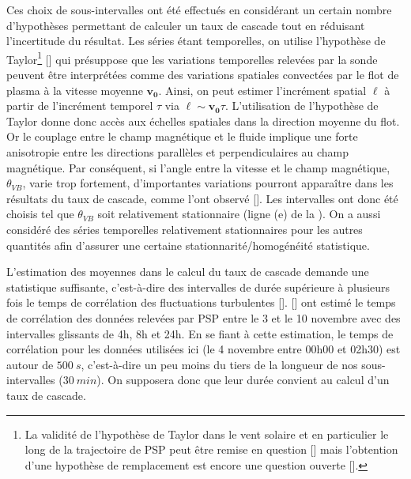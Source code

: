 Ces choix de sous-intervalles ont été effectués en considérant un certain nombre d'hypothèses permettant de calculer un taux de cascade tout en réduisant l'incertitude du résultat. Les séries étant temporelles, on utilise l'hypothèse de Taylor\footnote{La validité de l'hypothèse de Taylor dans le vent solaire et en particulier le long de la trajectoire de \ac{PSP} peut être remise en question [\cite{treumann_applicability_2019,chhiber_contextual_2019}] mais l'obtention d'une hypothèse de remplacement est encore une question ouverte [\cite{parashar_observations_2022}].} [\cite{taylor_spectrum_1937}] qui présuppose que les variations temporelles relevées par la sonde peuvent être interprétées comme des variations spatiales convectées par le flot de plasma à la vitesse moyenne $\boldsymbol{v_0}$. Ainsi, on peut estimer l'incrément spatial $\boldsymbol{\ell}$ à partir de l'incrément temporel $\tau $ via $ \boldsymbol{\ell} \sim \boldsymbol{v_0} \tau$. L'utilisation de l'hypothèse de Taylor donne donc accès aux échelles spatiales dans la direction moyenne du flot. Or le couplage entre le champ magnétique et le fluide implique une forte anisotropie entre les directions parallèles et perpendiculaires au champ magnétique. Par conséquent, si l'angle entre la vitesse et le champ magnétique, $\theta_{VB}$, varie trop fortement, d'importantes variations pourront apparaître dans les résultats du taux de cascade, comme l'ont observé [\cite{hadid_energy_2017}]. Les intervalles ont donc été choisis tel que $\theta_{VB}$ soit relativement stationnaire (ligne (e) de la ). On a aussi considéré des séries temporelles relativement stationnaires pour les autres quantités afin d'assurer une certaine stationnarité/homogénéité statistique. 

L'estimation des moyennes dans le calcul du taux de cascade demande une statistique suffisante, c'est-à-dire des intervalles de durée supérieure à plusieurs fois le temps de corrélation des fluctuations turbulentes [\cite{coburn_third-moment_2015}]. 
[\cite{parashar_measures_2020}] ont estimé le temps de corrélation des données relevées par \ac{PSP} entre le 3 et le 10 novembre avec des intervalles glissants de 4h, 8h et 24h. En se fiant à cette estimation, le temps de corrélation pour les données utilisées ici (le 4 novembre entre 00h00 et 02h30) est autour de $\SI{500}{s}$, c'est-à-dire un peu moins du tiers de la longueur de nos sous-intervalles ($\SI{30}{min}$). On supposera donc que leur durée convient au calcul d'un taux de cascade. 

